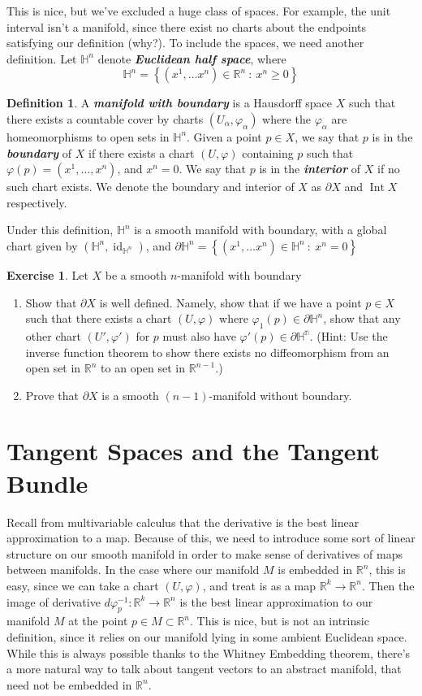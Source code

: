 \documentclass[psamsfonts]{amsart}
\theoremstyle{definition}
\newtheorem{defn}[thm]{Definition}
\newtheorem{exer}[thm]{Exercise}
\theoremstyle{remark}
\newcommand{\R}{\mathbb{R}}
\newcommand{\ib}[1]{\textbf{\textit{#1}}}
\newcommand{\inv}{^{-1}}
\newcommand{\set}[1]{\left\lbrace #1 \right\rbrace}
\newcommand{\bd}{\partial}
\DeclareMathOperator{\id}{id}
\DeclareMathOperator{\inter}{Int}
\begin{document}
This is nice, but we've excluded a huge class of spaces. For example, the
unit interval isn't a manifold, since there exist no charts about the
endpoints satisfying our definition (why?). To include the spaces, we
need another definition. Let $\mathbb{H}^n$ denote
\ib{Euclidean half space}, where
$$\mathbb{H}^n = \set{(x^1, \ldots x^n) \in \R^n ~:~ x^n \geq 0} $$
%
\begin{defn}
	A \ib{manifold with boundary} is a Hausdorff space $X$ such that there
	exists a countable cover by charts $(U_\alpha, \varphi_\alpha)$ where
	the $\varphi_\alpha$ are homeomorphisms to open sets in $\mathbb{H}^n$.
	Given a point $p \in X$, we say that $p$ is in the \ib{boundary} of
	$X$ if there exists a chart $(U, \varphi)$ containing $p$ such that
	$\varphi(p) = (x^1, \ldots, x^n)$, and $x^n = 0$. We say that $p$ is in
	the \ib{interior} of $X$ if no such chart exists. We denote the boundary
	and interior of $X$ as $\bd X$ and $\inter X$ respectively.
\end{defn}
%
Under this definition, $\mathbb{H}^n$ is a smooth manifold with boundary,
with a global chart given by $(\mathbb{H}^n, \id_{\mathbb{H}^n})$, and
$\bd \mathbb{H}^n = \set{(x^1, \ldots x^n) \in \mathbb{H}^n ~:~ x^n = 0}$
%
\begin{exer}
	Let $X$ be a smooth $n$-manifold with boundary
	\begin{enumerate}
		\item Show that $\bd X$ is
		well defined. Namely, show that if we have a point $p \in X$ such that
		there exists a chart $(U, \varphi)$ where $\varphi_1(p) \in \bd
		\mathbb{H}^n$, show that any other chart $(U', \varphi')$ for $p$ must
		also have $\varphi'(p) \in \bd \mathbb{H^n}$. (Hint: Use the inverse
		function theorem to show there exists no diffeomorphism from an open set
		in $\R^n$ to an open set in $\R^{n-1}$.)
		\item Prove that $\bd X$ is a smooth $(n-1)$-manifold without boundary.
	\end{enumerate}
\end{exer}
%
\section{Tangent Spaces and the Tangent Bundle}
%
Recall from multivariable calculus that the derivative is the best linear
approximation to a map. Because of this, we need to introduce some sort
of linear structure on our smooth manifold in order to make sense of
derivatives of maps between manifolds. In the case where our manifold $M$
is embedded in $\R^n$, this is easy, since we can take a chart
$(U, \varphi)$, and treat is as a map $\R^k \to \R^n$. Then
the image of derivative $d\varphi\inv_p : \R^k \to \R^n$ is the best
linear approximation to our manifold $M$ at the point $p \in M \subset
\R^n$. This is nice, but is not an intrinsic definition, since it relies
on our  manifold lying in some ambient Euclidean space. While this is
always possible thanks to the Whitney Embedding theorem, there's a more
natural way to talk about tangent vectors to an abstract manifold, that
need not be embedded in $\R^n$. \\
\end{document}
